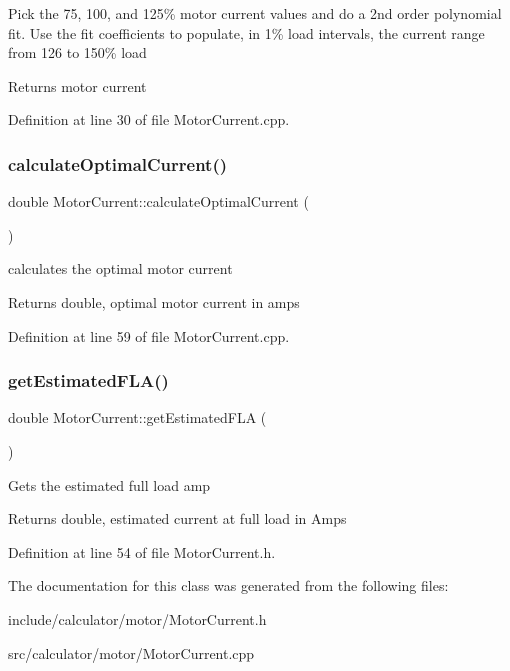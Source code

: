 Pick the 75, 100, and 125\% motor current values and do a 2nd order polynomial fit. Use the fit coefficients to populate, in 1\% load intervals, the current range from 126 to 150\% load \begin{DoxyReturn}{Returns}
motor current 
\end{DoxyReturn}


Definition at line 30 of file Motor\+Current.\+cpp.

\mbox{\label{class_motor_current_a40638a00e4d21b34c74f8406f4e70046}} 
\subsubsection{\texorpdfstring{calculate\+Optimal\+Current()}{calculateOptimalCurrent()}}
{\footnotesize\ttfamily double Motor\+Current\+::calculate\+Optimal\+Current (\begin{DoxyParamCaption}{ }\end{DoxyParamCaption})}

calculates the optimal motor current \begin{DoxyReturn}{Returns}
double, optimal motor current in amps 
\end{DoxyReturn}


Definition at line 59 of file Motor\+Current.\+cpp.

\mbox{\label{class_motor_current_a0f845ec03585b21a8e476ed3e63f365f}} 
\subsubsection{\texorpdfstring{get\+Estimated\+F\+L\+A()}{getEstimatedFLA()}}
{\footnotesize\ttfamily double Motor\+Current\+::get\+Estimated\+F\+LA (\begin{DoxyParamCaption}{ }\end{DoxyParamCaption})\hspace{0.3cm}{\ttfamily [inline]}}

Gets the estimated full load amp \begin{DoxyReturn}{Returns}
double, estimated current at full load in Amps 
\end{DoxyReturn}


Definition at line 54 of file Motor\+Current.\+h.



The documentation for this class was generated from the following files\+:\begin{DoxyCompactItemize}
\item 
include/calculator/motor/Motor\+Current.\+h\item 
src/calculator/motor/Motor\+Current.\+cpp\end{DoxyCompactItemize}

